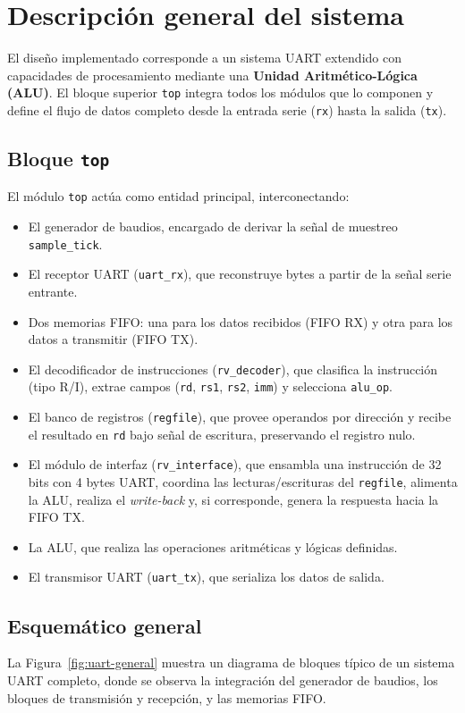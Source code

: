 \section{Descripción general del sistema}

El diseño implementado corresponde a un sistema UART extendido con capacidades de procesamiento mediante una \textbf{Unidad Aritmético-Lógica (ALU)}. El bloque superior \texttt{top} integra todos los módulos que lo componen y define el flujo de datos completo desde la entrada serie (\texttt{rx}) hasta la salida (\texttt{tx}).

\subsection{Bloque \texttt{top}}
El módulo \texttt{top} actúa como entidad principal, interconectando:
\begin{itemize}
    \item El generador de baudios, encargado de derivar la señal de muestreo \texttt{sample\_tick}.
    \item El receptor UART (\texttt{uart\_rx}), que reconstruye bytes a partir de la señal serie entrante.
    \item Dos memorias FIFO: una para los datos recibidos (FIFO RX) y otra para los datos a transmitir (FIFO TX).
    \item El decodificador de instrucciones (\texttt{rv\_decoder}), que clasifica la instrucción (tipo R/I), extrae campos (\texttt{rd}, \texttt{rs1}, \texttt{rs2}, \texttt{imm}) y selecciona \texttt{alu\_op}.
    \item El banco de registros (\texttt{regfile}), que provee operandos por dirección y recibe el resultado en \texttt{rd} bajo señal de escritura, preservando el registro nulo.
    \item El módulo de interfaz (\texttt{rv\_interface}), que ensambla una instrucción de 32 bits con 4 bytes UART, coordina las lecturas/escrituras del \texttt{regfile}, alimenta la ALU, realiza el \textit{write-back} y, si corresponde, genera la respuesta hacia la FIFO TX.
    \item La ALU, que realiza las operaciones aritméticas y lógicas definidas.
    \item El transmisor UART (\texttt{uart\_tx}), que serializa los datos de salida.
\end{itemize}

\newpage

\subsection{Esquemático general}
La Figura~\ref{fig:uart-general} muestra un diagrama de bloques típico de un sistema UART completo, donde se observa la integración del generador de baudios, los bloques de transmisión y recepción, y las memorias FIFO.

